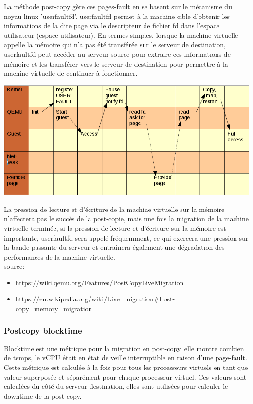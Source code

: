 La méthode post-copy gère ces pages-fault en se basant sur le mécanisme du noyau linux 'userfaultfd'.
userfaultfd permet à la machine cible d'obtenir les informations de la dite page via le descripteur de fichier fd dans l'espace utilisateur (espace utilisateur).
En termes simples, lorsque la machine virtuelle appelle la mémoire qui n'a pas été transférée sur le serveur de destination, userfaultfd peut accéder au serveur source pour extraire ces informations de mémoire et les transférer vers le serveur de destination pour permettre à la machine virtuelle de continuer à fonctionner.

\includegraphics[width=\textwidth]{include/Postcopyflow}


La pression de lecture et d'écriture de la machine virtuelle sur la mémoire n'affectera pas le succès de la post-copie, mais une fois la migration de la machine virtuelle terminée, si la pression de lecture et d'écriture sur la mémoire est importante, userfaultfd sera appelé fréquemment, ce qui exercera une pression sur la bande passante du serveur et entraînera également une dégradation des performances de la machine virtuelle.
\\

source: 
\begin{itemize}
    \item \url{https://wiki.qemu.org/Features/PostCopyLiveMigration}
    \item \url{https://en.wikipedia.org/wiki/Live_migration#Post-copy_memory_migration}
\end{itemize}

\subsubsection*{Postcopy blocktime}
Blocktime est une métrique pour la migration en post-copy, elle montre combien de temps, le vCPU était en état de veille interruptible en raison d'une page-fault.
Cette métrique est calculée à la fois pour tous les processeurs virtuels en tant que valeur superposée et
séparément pour chaque processeur virtuel. Ces valeurs sont calculées du côté du serveur destination, elles sont utilisées pour calculer le downtime de la post-copy.

